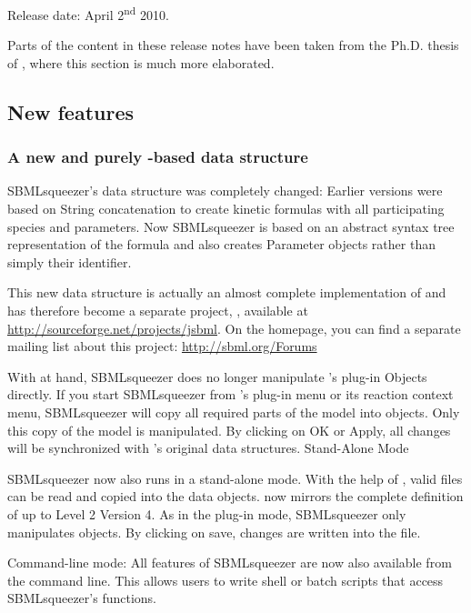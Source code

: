 Release date: April 2\textsuperscript{nd} 2010.

Parts of the content in these release notes have been taken from the Ph.D.
thesis of \citealp{Draeger2011a}, where this section is much more elaborated.

\subsection{New features}

\subsubsection{A new and purely \Java-based \SBML data structure}

SBMLsqueezer's data structure was completely changed: Earlier versions were
based on String concatenation to create kinetic formulas with all participating
species and parameters. Now SBMLsqueezer is based on an abstract syntax tree
representation of the formula and also creates Parameter objects rather than
simply their identifier.

This new data structure is actually an almost complete \Java implementation of
\SBML and has therefore become a separate project, \JSBML, available at
\url{http://sourceforge.net/projects/jsbml}. On the \SBML homepage, you can find
a separate mailing list about this project: \url{http://sbml.org/Forums}

With \JSBML at hand, SBMLsqueezer does no longer manipulate \CellDesigner's
plug-in Objects directly. If you start SBMLsqueezer from \CellDesigner's plug-in
menu or its reaction context menu, SBMLsqueezer will copy all required parts of
the model into \JSBML objects. Only this copy of the model is manipulated. By
clicking on OK or Apply, all changes will be synchronized with \CellDesigner's
original data structures.
Stand-Alone Mode

SBMLsqueezer now also runs in a stand-alone mode. With the help of \libSBML,
valid \SBML files can be read and copied into the \JSBML data objects. \JSBML now
mirrors the complete definition of \SBML up to Level 2 Version 4. As in the
\CellDesigner plug-in mode, SBMLsqueezer only manipulates \JSBML objects. By
clicking on save, changes are written into the \SBML file.

Command-line mode: All features of SBMLsqueezer are now also available from the
command line. This allows users to write shell or batch scripts that access
SBMLsqueezer's functions.

